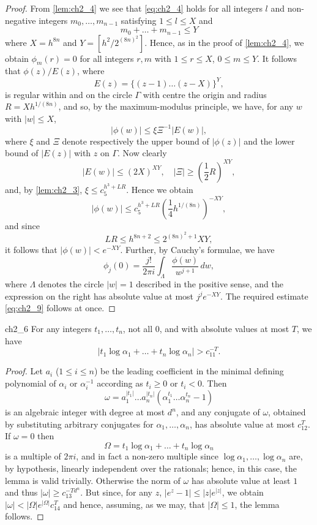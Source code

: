 \begin{proof}
From \autoref{lem:ch2_4} we see that \eqref{eq:ch2_4} holds for all integers $l$ and non-negative integers $m_0, \dots, m_{n-1}$ satisfying $1 \le l \le X$ and
\[
m_0 + \dots + m_{n-1} \le Y
\]
where $X = h^{8n}$ and $Y = \left[h^2/2^{(8n)^2}\right]$. Hence, as in the proof of \autoref{lem:ch2_4}, we obtain $\phi_m(r) = 0$ for all integers $r, m$ with $1 \le r \le X$, $0 \le m \le Y$. It follows that $\phi(z)/E(z)$, where
\[
E(z) = \{(z-1) \dots (z-X)\}^Y,
\]
is regular within and on the circle $\Gamma$ with centre the origin and radius $R = X h^{1/(8n)}$, and so, by the maximum-modulus principle, we have, for any $w$ with $|w| \le X$,
\[
|\phi(w)| \le \xi \Xi^{-1} |E(w)|,
\]
where $\xi$ and $\Xi$ denote respectively the upper bound of $|\phi(z)|$ and the lower bound of $|E(z)|$ with $z$ on $\Gamma$. Now clearly
\[
|E(w)| \le (2X)^{XY}, \quad |\Xi| \ge \left(\frac{1}{2}R\right)^{XY},
\]
and, by \autoref{lem:ch2_3}, $\xi \le c_5^{h^3+LR}$. Hence we obtain
\[
|\phi(w)| \le c_5^{h^3+LR} \left(\frac{1}{4} h^{1/(8n)}\right)^{-XY},
\]
and since
\[
LR \le h^{8n+2} \le 2^{(8n)^2+1} XY,
\]
it follows that $|\phi(w)| < e^{-XY}$. Further, by Cauchy's formulae, we have
\[
\phi_j(0) = \frac{j!}{2\pi i} \int_{\Lambda} \frac{\phi(w)}{w^{j+1}} \, dw,
\]
where $\Lambda$ denotes the circle $|w|=1$ described in the positive sense, and the expression on the right has absolute value at most $j^j e^{-XY}$. The required estimate \eqref{eq:ch2_9} follows at once.
\end{proof}

\begin{mylemma}{}{ch2_6}
For any integers $t_1, \dots, t_n$, not all $0$, and with absolute values at most $T$, we have
\[
|t_1 \log \alpha_1 + \dots + t_n \log \alpha_n| > c_{11}^{-T}.
\]
\end{mylemma}

\begin{proof}
Let $a_i$ ($1 \le i \le n$) be the leading coefficient in the minimal defining polynomial of $\alpha_i$ or $\alpha_i^{-1}$ according as $t_i \ge 0$ or $t_i < 0$. Then
\[
\omega = a_1^{|t_1|} \dots a_n^{|t_n|} (\alpha_1^{t_1} \dots \alpha_n^{t_n} - 1)
\]
is an algebraic integer with degree at most $d^n$, and any conjugate of $\omega$, obtained by substituting arbitrary conjugates for $\alpha_1, \dots, \alpha_n$, has absolute value at most $c_{12}^T$. If $\omega = 0$ then
\[
\Omega = t_1 \log \alpha_1 + \dots + t_n \log \alpha_n
\]
is a multiple of $2\pi i$, and in fact a non-zero multiple since $\log \alpha_1, \dots, \log \alpha_n$ are, by hypothesis, linearly independent over the rationals; hence, in this case, the lemma is valid trivially. Otherwise the norm of $\omega$ has absolute value at least $1$ and thus $|\omega| \ge c_{13}^{-T d^n}$. But since, for any $z$, $|e^z - 1| \le |z| e^{|z|}$, we obtain $|\omega| < |\Omega| e^{|\Omega|} c_{14}^T$ and hence, assuming, as we may, that $|\Omega| \le 1$, the lemma follows.
\end{proof}

